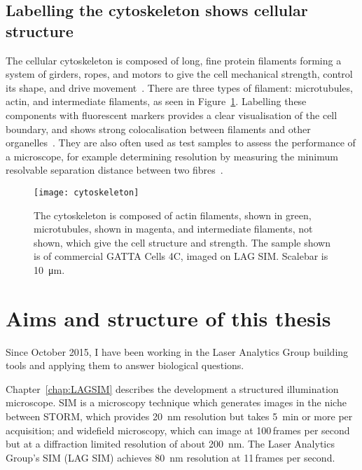 \subsection{Labelling the cytoskeleton shows cellular structure} \label{sec:cytoskeleton}
The cellular cytoskeleton is composed of long, fine protein filaments forming a system of girders, ropes, and motors to give the cell mechanical strength, control its shape, and drive movement~\cite{alberts2013essential}.
There are three types of filament: microtubules, actin, and intermediate filaments, as seen in Figure~\ref{fig:cytoskeleton}. 
Labelling these components with fluorescent markers provides a clear visualisation of the cell boundary, and shows strong colocalisation between filaments and other organelles~\cite{melkov2017regulation}. 
They are also often used as test samples to assess the performance of a microscope, for example determining resolution by measuring the minimum resolvable separation distance between two fibres~\cite{dyba2003immunofluorescence, wegel2016imaging}. 

\begin{figure}[htbp!]
\centering
\texttt{[image: cytoskeleton]}
\caption[Introduction: The cytoskeleton gives the cell structure and strength]{The cytoskeleton is composed of actin filaments, shown in green, microtubules, shown in magenta, and intermediate filaments, not shown, which give the cell structure and strength. The sample shown is of commercial GATTA Cells 4C, imaged on LAG SIM. Scalebar is \SI{10}{\micro\metre}.}
\label{fig:cytoskeleton}
\end{figure}

\section{Aims and structure of this thesis}
Since October 2015, I have been working in the Laser Analytics Group building tools and applying them to answer biological questions. 

Chapter~\ref{chap:LAGSIM} describes the development a structured illumination microscope. 
SIM is a microscopy technique which generates images in the niche between STORM, which provides \SI{20}{\nano\metre} resolution but takes \SI{5}{\minute} or more per acquisition; and widefield microscopy, which can image at 100\,frames per second but at a diffraction limited resolution of about \SI{200}{\nano\metre}. 
The Laser Analytics Group's SIM (LAG SIM) achieves \SI{80}{\nano\metre} resolution at 11\,frames per second. 

